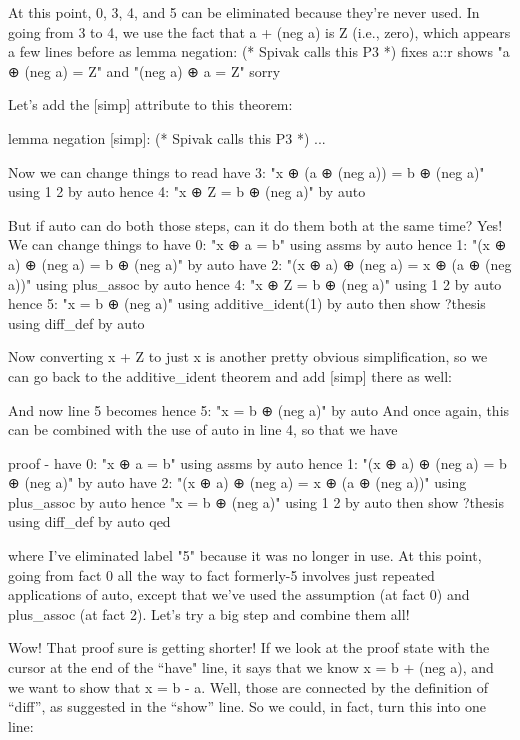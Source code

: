 At this point, 0, 3, 4, and 5 can be eliminated because they're never used. In going from 3 to 4, we use the fact that a + (neg a) is Z (i.e., zero), which appears a few lines before as 
lemma  negation: (* Spivak calls this P3 *)
  fixes a::r
  shows "a ⊕ (neg a) =  Z"
  and  "(neg a) ⊕ a =  Z"
  sorry

Let's add the [simp] attribute to this theorem:

lemma  negation [simp]: (* Spivak calls this P3 *)
...

Now we can change things to read
have 3: "x ⊕ (a ⊕ (neg a)) = b ⊕ (neg a)" using 1 2 by auto
hence 4: "x ⊕ Z = b ⊕ (neg a)" by auto

But if auto can do both those steps, can it do them both at the same time? Yes! We can change things to 
  have 0: "x ⊕ a = b" using assms by auto
  hence 1: "(x ⊕ a) ⊕ (neg a) = b ⊕ (neg a)" by auto
  have 2: "(x ⊕ a) ⊕ (neg a) = x ⊕ (a ⊕ (neg a))" using plus_assoc by auto
  hence 4: "x ⊕ Z = b ⊕ (neg a)" using 1 2  by auto
  hence 5: "x = b ⊕ (neg a)" using additive_ident(1) by auto
  then show ?thesis using diff_def by auto

Now converting x + Z to just x is another pretty obvious simplification, so we can go back to the additive_ident theorem and add [simp] there as well:

And now line 5 becomes
 hence 5: "x = b ⊕ (neg a)" by auto
And once again, this can be combined with the use of auto in line 4, so that we have

proof -
  have 0: "x ⊕ a = b" using assms by auto
  hence 1: "(x ⊕ a) ⊕ (neg a) = b ⊕ (neg a)" by auto
  have 2: "(x ⊕ a) ⊕ (neg a) = x ⊕ (a ⊕ (neg a))" using plus_assoc by auto
  hence "x = b ⊕ (neg a)" using 1 2 by auto
  then show ?thesis using diff_def by auto
qed

where I've eliminated label "5" because it was no longer in use. At this point, going from fact 0 all the way to fact formerly-5 involves just repeated applications of auto, except that we've used the assumption (at fact 0) and plus_assoc (at fact 2). Let's try a big step and combine them all!



Wow! That proof sure is getting shorter! If we look at the proof state with the cursor at the end of the ``have" line, it says that we know x = b + (neg a), and we want to show that x = b - a. Well, those are connected by the definition of ``diff'', as suggested in the ``show'' line. So we could, in fact, turn this into one line:

